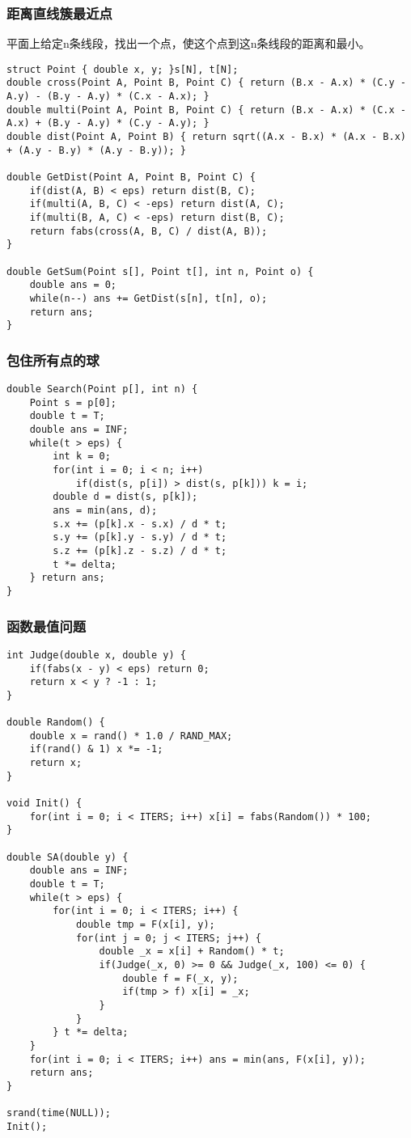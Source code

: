 \subsubsection{距离直线簇最近点}

平面上给定n条线段，找出一个点，使这个点到这n条线段的距离和最小。

\begin{lstlisting}
struct Point { double x, y; }s[N], t[N];
double cross(Point A, Point B, Point C) { return (B.x - A.x) * (C.y - A.y) - (B.y - A.y) * (C.x - A.x); }
double multi(Point A, Point B, Point C) { return (B.x - A.x) * (C.x - A.x) + (B.y - A.y) * (C.y - A.y); }
double dist(Point A, Point B) { return sqrt((A.x - B.x) * (A.x - B.x) + (A.y - B.y) * (A.y - B.y)); }

double GetDist(Point A, Point B, Point C) {
	if(dist(A, B) < eps) return dist(B, C);
	if(multi(A, B, C) < -eps) return dist(A, C);
	if(multi(B, A, C) < -eps) return dist(B, C);
	return fabs(cross(A, B, C) / dist(A, B));
}

double GetSum(Point s[], Point t[], int n, Point o) {
	double ans = 0;
	while(n--) ans += GetDist(s[n], t[n], o);
	return ans;
}
\end{lstlisting}

\subsubsection{包住所有点的球}

\begin{lstlisting}
double Search(Point p[], int n) {
	Point s = p[0];
	double t = T;
	double ans = INF;
	while(t > eps) {
		int k = 0;
		for(int i = 0; i < n; i++)
			if(dist(s, p[i]) > dist(s, p[k])) k = i;
		double d = dist(s, p[k]);
		ans = min(ans, d);
		s.x += (p[k].x - s.x) / d * t;
		s.y += (p[k].y - s.y) / d * t;
		s.z += (p[k].z - s.z) / d * t;
		t *= delta;
	} return ans;
}
\end{lstlisting}


\subsubsection{函数最值问题}

\begin{lstlisting}
int Judge(double x, double y) {
	if(fabs(x - y) < eps) return 0;
	return x < y ? -1 : 1;
}

double Random() {
	double x = rand() * 1.0 / RAND_MAX;
	if(rand() & 1) x *= -1;
	return x;
}

void Init() {
	for(int i = 0; i < ITERS; i++) x[i] = fabs(Random()) * 100;
}

double SA(double y) {
	double ans = INF;
	double t = T;
	while(t > eps) {
		for(int i = 0; i < ITERS; i++) {
			double tmp = F(x[i], y);
			for(int j = 0; j < ITERS; j++) {
				double _x = x[i] + Random() * t;
				if(Judge(_x, 0) >= 0 && Judge(_x, 100) <= 0) {
					double f = F(_x, y);
					if(tmp > f) x[i] = _x;
				}
			} 
		} t *= delta;
	}
	for(int i = 0; i < ITERS; i++) ans = min(ans, F(x[i], y));
	return ans;
}

srand(time(NULL));
Init();
\end{lstlisting}


